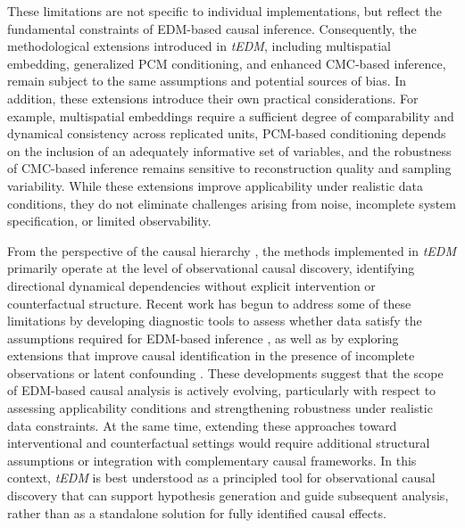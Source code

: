 \documentclass[authoryear,preprint,review,12pt]{elsarticle}
\begin{document}
These limitations are not specific to individual implementations, but reflect the fundamental constraints of EDM-based causal inference. Consequently, the methodological extensions introduced in \textit{tEDM}, including multispatial embedding, generalized PCM conditioning, and enhanced CMC-based inference, remain subject to the same assumptions and potential sources of bias. In addition, these extensions introduce their own practical considerations. For example, multispatial embeddings require a sufficient degree of comparability and dynamical consistency across replicated units, PCM-based conditioning depends on the inclusion of an adequately informative set of variables, and the robustness of CMC-based inference remains sensitive to reconstruction quality and sampling variability. While these extensions improve applicability under realistic data conditions, they do not eliminate challenges arising from noise, incomplete system specification, or limited observability.

From the perspective of the causal hierarchy \citep{pearl2018why}, the methods implemented in \textit{tEDM} primarily operate at the level of observational causal discovery, identifying directional dynamical dependencies without explicit intervention or counterfactual structure. Recent work has begun to address some of these limitations by developing diagnostic tools to assess whether data satisfy the assumptions required for EDM-based inference \citep{butler2023discussion_of_ccm}, as well as by exploring extensions that improve causal identification in the presence of incomplete observations or latent confounding \citep{yan2026cic}. These developments suggest that the scope of EDM-based causal analysis is actively evolving, particularly with respect to assessing applicability conditions and strengthening robustness under realistic data constraints. At the same time, extending these approaches toward interventional and counterfactual settings would require additional structural assumptions or integration with complementary causal frameworks. In this context, \textit{tEDM} is best understood as a principled tool for observational causal discovery that can support hypothesis generation and guide subsequent analysis, rather than as a standalone solution for fully identified causal effects.
\end{document}
